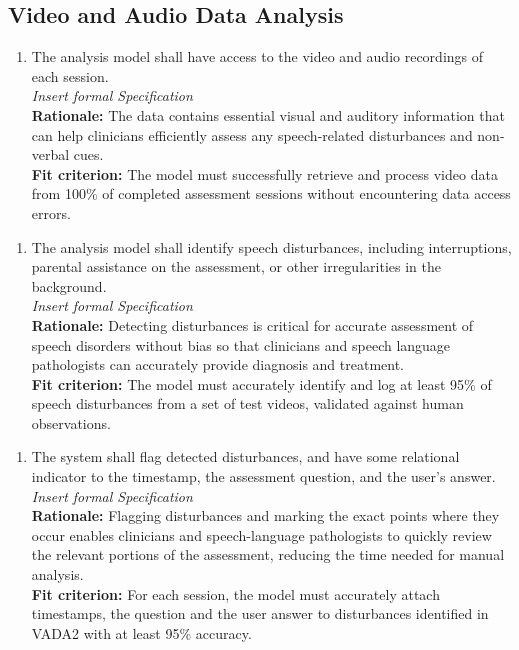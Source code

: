 \documentclass[12pt]{article}
\begin{document}
\subsection{Video and Audio Data Analysis}
\begin{enumerate}[{FR-VADA}4. ]
  \item The analysis model shall have access to the video and audio recordings of each session.\\
  \textit{Insert formal Specification}\\
  \textbf{Rationale: }The data contains essential visual and auditory information that can help clinicians 
  efficiently assess any speech-related disturbances and non-verbal cues.\\
  \textbf{Fit criterion: }The model must successfully retrieve and process video data from 100\% of 
  completed assessment sessions without encountering data access errors.
\end{enumerate}
\begin{enumerate}[{FR-VADA}2. ]
  \item The analysis model shall identify speech disturbances, including interruptions, parental 
  assistance on the assessment, or other irregularities in the background.\\
  \textit{Insert formal Specification}\\
  \textbf{Rationale: }Detecting disturbances is critical for accurate assessment of speech disorders without 
  bias so that clinicians and speech language pathologists can accurately provide diagnosis and treatment.\\
  \textbf{Fit criterion: }The model must accurately identify and log at least 95\% of speech disturbances 
  from a set of test videos, validated against human observations.
\end{enumerate}
\begin{enumerate}[{FR-VADA}3. ]
  \item The system shall flag detected disturbances, and have some relational indicator to the timestamp, the assessment question, and the user's answer.\\
  \textit{Insert formal Specification}\\
  \textbf{Rationale: }Flagging disturbances and marking the exact points where they occur enables clinicians and 
  speech-language pathologists to quickly review the relevant portions of the assessment, reducing the time needed 
  for manual analysis.\\
  \textbf{Fit criterion: }For each session, the model must accurately attach timestamps, the question and the user answer to disturbances
  identified in VADA2 with at least 95\% accuracy.
\end{enumerate}
\end{document}
